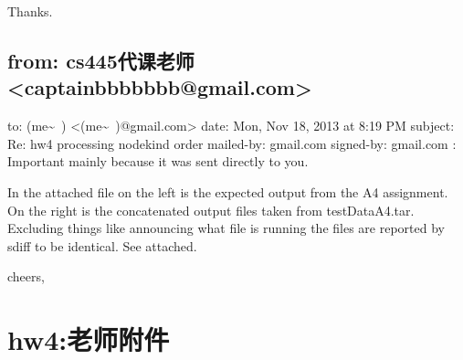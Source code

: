 \documentclass[12pt]{book}
\begin{document}
Thanks. 


\section{from:         cs445代课老师 <captainbbbbbbb@gmail.com>}
\label{sec-48-7}
to:         (me\textasciitilde{}~) <(me\textasciitilde{}~)@gmail.com>
date:         Mon, Nov 18, 2013 at 8:19 PM
subject:         Re: hw4 processing nodekind order
mailed-by:         gmail.com
signed-by:         gmail.com
:         Important mainly because it was sent directly to you.

In the attached file on the left is the expected output from the A4 assignment.   On the right is the concatenated output files taken from testDataA4.tar.   Excluding things like announcing what file is running the files are reported by sdiff to be identical.   See attached.

cheers,

\chapter{hw4:老师附件}
\label{sec-49}
\end{document}
